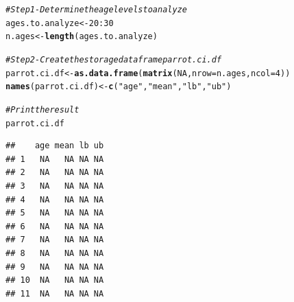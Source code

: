 \documentclass{tufte-book}\usepackage[]{graphicx}\usepackage[]{color}
\makeatletter
\newcommand{\hlnum}[1]{\textcolor[rgb]{0.686,0.059,0.569}{#1}}%
\newcommand{\hlstr}[1]{\textcolor[rgb]{0.192,0.494,0.8}{#1}}%
\newcommand{\hlcom}[1]{\textcolor[rgb]{0.678,0.584,0.686}{\textit{#1}}}%
\newcommand{\hlopt}[1]{\textcolor[rgb]{0,0,0}{#1}}%
\newcommand{\hlstd}[1]{\textcolor[rgb]{0.345,0.345,0.345}{#1}}%
\newcommand{\hlkwb}[1]{\textcolor[rgb]{0.69,0.353,0.396}{#1}}%
\newcommand{\hlkwc}[1]{\textcolor[rgb]{0.333,0.667,0.333}{#1}}%
\newcommand{\hlkwd}[1]{\textcolor[rgb]{0.737,0.353,0.396}{\textbf{#1}}}%
\newenvironment{kframe}{%
 \def\at@end@of@kframe{}%
 \ifinner\ifhmode%
  \def\at@end@of@kframe{\end{minipage}}%
  \begin{minipage}{\columnwidth}%
 \fi\fi%
 \def\FrameCommand##1{\hskip\@totalleftmargin \hskip-\fboxsep
 \colorbox{shadecolor}{##1}\hskip-\fboxsep
     \hskip-\linewidth \hskip-\@totalleftmargin \hskip\columnwidth}%
 \MakeFramed {\advance\hsize-\width
   \@totalleftmargin\z@ \linewidth\hsize
   \@setminipage}}%
 {\par\unskip\endMakeFramed%
 \at@end@of@kframe}
\newenvironment{knitrout}{}{} %
\makeatother
\begin{document}
\begin{footnotesize}
\pagebreak


\begin{knitrout}
\color{fgcolor}\begin{kframe}
\begin{alltt}
\hlcom{# Step 1 - Determine the age levels to analyze}
\hlstd{ages.to.analyze} \hlkwb{<-} \hlnum{20}\hlopt{:}\hlnum{30}
\hlstd{n.ages} \hlkwb{<-} \hlkwd{length}\hlstd{(ages.to.analyze)}

\hlcom{# Step 2 - Create the storage dataframe parrot.ci.df}
\hlstd{parrot.ci.df} \hlkwb{<-} \hlkwd{as.data.frame}\hlstd{(}\hlkwd{matrix}\hlstd{(}\hlnum{NA}\hlstd{,} \hlkwc{nrow} \hlstd{= n.ages,} \hlkwc{ncol} \hlstd{=} \hlnum{4}\hlstd{))}
\hlkwd{names}\hlstd{(parrot.ci.df)} \hlkwb{<-} \hlkwd{c}\hlstd{(}\hlstr{"age"}\hlstd{,} \hlstr{"mean"}\hlstd{,} \hlstr{"lb"}\hlstd{,} \hlstr{"ub"}\hlstd{)}

\hlcom{# Print the result}
\hlstd{parrot.ci.df}
\end{alltt}
\begin{verbatim}
##    age mean lb ub
## 1   NA   NA NA NA
## 2   NA   NA NA NA
## 3   NA   NA NA NA
## 4   NA   NA NA NA
## 5   NA   NA NA NA
## 6   NA   NA NA NA
## 7   NA   NA NA NA
## 8   NA   NA NA NA
## 9   NA   NA NA NA
## 10  NA   NA NA NA
## 11  NA   NA NA NA
\end{verbatim}
\end{kframe}
\end{knitrout}




\end{footnotesize}
\end{document}
